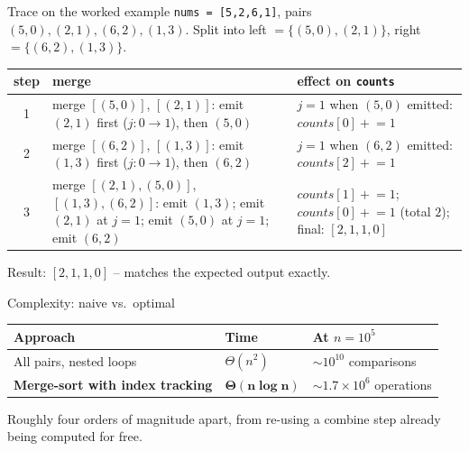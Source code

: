 \documentclass[11pt,aspectratio=169]{beamer}
\begin{document}
\begin{frame}{Trace on the worked example}
  \scriptsize
  \texttt{nums = [5,2,6,1]}, pairs $(5,0),(2,1),(6,2),(1,3)$. Split into left
  $=\{(5,0),(2,1)\}$, right $=\{(6,2),(1,3)\}$.
  \begin{center}
  \scriptsize
  \begin{tabular}{@{}c p{5.4cm} p{3.4cm}@{}}
    \toprule
    step & merge & effect on \texttt{counts} \\
    \midrule
    1 & merge $[(5,0)]$, $[(2,1)]$: emit $(2,1)$ first ($j{:}0{\to}1$), then $(5,0)$ &
    $j{=}1$ when $(5,0)$ emitted: $counts[0]\mathrel{+}=1$ \\
    2 & merge $[(6,2)]$, $[(1,3)]$: emit $(1,3)$ first ($j{:}0{\to}1$), then $(6,2)$ &
    $j{=}1$ when $(6,2)$ emitted: $counts[2]\mathrel{+}=1$ \\
    3 & merge $[(2,1),(5,0)]$, $[(1,3),(6,2)]$: emit $(1,3)$; emit $(2,1)$ at $j{=}1$;
    emit $(5,0)$ at $j{=}1$; emit $(6,2)$ &
    $counts[1]\mathrel{+}=1$; $counts[0]\mathrel{+}=1$ (total $2$); final:
    $[2,1,1,0]$ \\
    \bottomrule
  \end{tabular}
  \end{center}
  \small Result: $[2,1,1,0]$ -- matches the expected output exactly.
\end{frame}

\begin{frame}{Complexity: naive vs.\ optimal}
  \begin{center}
  \begin{tabular}{@{}lll@{}}
    \toprule
    Approach & Time & At $n = 10^5$ \\
    \midrule
    All pairs, nested loops & $\Theta(n^2)$ & $\sim 10^{10}$ comparisons \\
    \textbf{Merge-sort with index tracking} & $\boldsymbol{\Theta(n \log n)}$ & $\sim
    1.7\times10^6$ operations \\
    \bottomrule
  \end{tabular}
  \end{center}
  Roughly four orders of magnitude apart, from re-using a combine step already being
  computed for free.
\end{frame}
\end{document}
